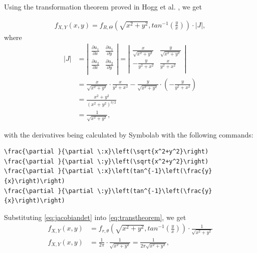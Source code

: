 Using the transformation theorem proved in Hogg et al. \cite[Chapter~2.7]{hogg}, we get
 
\begin{equation}
\begin{split}
f_{X,Y}(x,y) = f_{R,\Theta}\left(\sqrt{x^2+y^2},tan^{-1}\left(\frac{y}{x}\right)\right) \cdot |J|,
\end{split}
\label{eq:transtheorem}
\end{equation}
where 
\begin{equation}
\begin{split}
|J| &=
\left|
\begin{matrix}
\frac{\partial u_1}{\partial x} & 
\frac{\partial u_1}{\partial y}  \\[2ex] %
\frac{\partial u_2}{\partial x} & 
\frac{\partial u_2}{\partial y}  \\[2ex]
\end{matrix}
\right|
= 
\left|
\begin{matrix}
\frac{x}{\sqrt{x^2+y^2}}& 
\frac{y}{\sqrt{x^2+y^2}}  \\[2ex] %
-\frac{y}{y^2+x^2} & 
\frac{x}{y^2+x^2}  \\[2ex]
\end{matrix}
\right|\\[2ex]
&= \frac{x}{\sqrt{x^2+y^2}} \cdot \frac{x}{y^2+x^2} -\frac{y}{\sqrt{x^2+y^2}}  \cdot \left(-\frac{y}{y^2+x^2}\right)\\[2ex]
&= \frac{x^2+y^2}{(x^2+y^2)^{3/2}}\\[2ex]
&=\frac{1}{\sqrt{x^2+y^2}},
\end{split}
\label{eq:jacobiandet}
\end{equation}

with the derivatives being calculated by Symbolab \cite{symbolab} with the following commands:
\begin{lstlisting}
\frac{\partial }{\partial \:x}\left(\sqrt{x^2+y^2}\right)
\frac{\partial }{\partial \:y}\left(\sqrt{x^2+y^2}\right)
\frac{\partial }{\partial \:x}\left(tan^{-1}\left(\frac{y}{x}\right)\right)
\frac{\partial }{\partial \:y}\left(tan^{-1}\left(\frac{y}{x}\right)\right)
\end{lstlisting}

Substituting \eqref{eq:jacobiandet} into \eqref{eq:transtheorem}, we get
\begin{equation}
\begin{split}
f_{X,Y}(x,y) &= f_{r,\theta}\left(\sqrt{x^2+y^2},tan^{-1}\left(\frac{y}{x}\right)\right) \cdot \frac{1}{\sqrt{x^2+y^2}}\\[2ex]
f_{X,Y}(x,y) &= \frac{1}{2\pi} \cdot \frac{1}{\sqrt{x^2+y^2}} = \frac{1}{2\pi\sqrt{x^2+y^2}},
\end{split}
\label{eq:transtheoremcomplete}
\end{equation}

